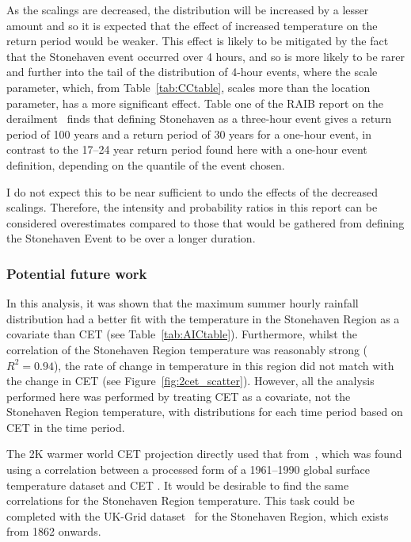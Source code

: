 As the scalings are decreased,
    the distribution will be increased by a lesser amount and so it is expected that the effect of increased temperature on the return period would be weaker.
This effect is likely to be mitigated by the fact that the Stonehaven event occurred over 4 hours,
    and so is more likely to be rarer and further into the tail of the distribution of 4-hour events,
    where the scale parameter,
    which, from Table~\ref{tab:CCtable}, scales more than the location parameter,
    has a more significant effect.
Table one of the RAIB report on the derailment~\cite{RAIB_2022} finds that defining Stonehaven as a three-hour event gives a
    return period of 100 years and a return period of 30 years for a one-hour event,
    in contrast to the 17--24 year return period found here with a one-hour event definition,
    depending on the quantile of the event chosen.

I do not expect this to be near sufficient to undo the effects of the decreased scalings.
Therefore,
    the intensity and probability ratios in this report can be considered overestimates compared to those that would be
    gathered from defining the Stonehaven Event to be over a longer duration.

\subsubsection{Potential future work}

In this analysis,
    it was shown that the maximum summer hourly rainfall distribution had a better fit with the temperature in the Stonehaven Region
    as a covariate than CET (see Table~\ref{tab:AICtable}).
Furthermore,
    whilst the correlation of the Stonehaven Region temperature was reasonably strong ($R^2 = 0.94$),
    the rate of change in temperature in this region did not match with the change in CET (see Figure~\ref{fig:2cet_scatter}).
However,
    all the analysis performed here was performed by treating CET as a covariate,
    not the Stonehaven Region temperature,
    with distributions for each time period based on CET in the time period.

The 2K warmer world CET projection directly used that from~\cite{Tett_Soon},
    which was found using a correlation between a processed form of a 1961--1990 global surface temperature dataset and CET .
It would be desirable to find the same correlations for the Stonehaven Region temperature.
This task could be completed with the UK-Grid dataset~\cite{UKGrid} for the Stonehaven Region,
    which exists from 1862 onwards.

